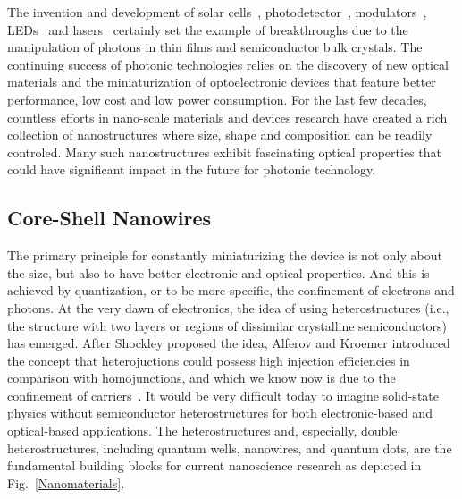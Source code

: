 The invention and development of solar
cells~\cite{sun2005organic,perlin1999space},
photodetector~\cite{razeghi1996semiconductor,rogalski2002infrared},
modulators~\cite{chen2011broadband,schuller2010plasmonics},
LEDs~\cite{spanggaard2004brief,schubert2005solid,schubert2005light} and
lasers~\cite{chow2012semiconductor,yablonovitch1987inhibited} certainly set the
example of breakthroughs due to the manipulation of photons in thin films and
semiconductor bulk crystals. The continuing success of photonic technologies
relies on the discovery of new optical materials and the miniaturization of
optoelectronic devices that feature better performance, low cost and low power
consumption. For the last few decades, countless efforts in nano-scale
materials and devices research have created a rich collection of nanostructures
where size, shape and composition can be readily controled. Many such
nanostructures exhibit fascinating optical properties that could have
significant impact in the future for photonic technology.

\subsection{Core-Shell Nanowires} \label{sec:intro_CSNW}

The primary principle for constantly miniaturizing the device is not only about
the size, but also to have better electronic and optical properties. And
this is achieved by quantization, or to be more specific, the confinement of
electrons and photons. At the very dawn of electronics, the idea of using
heterostructures (i.e., the structure with two layers or regions of dissimilar
crystalline semiconductors) has emerged. After Shockley proposed the idea,
Alferov and Kroemer introduced the concept that heterojuctions could possess
high injection efficiencies in comparison with homojunctions, and which we know now
is due to the confinement of carriers~\cite{alferov2000double}. It would be
very difficult today to imagine solid-state physics without semiconductor
heterostructures for both electronic-based and optical-based applications. The
heterostructures and, especially, double heterostructures, including quantum
wells, nanowires, and quantum dots, are the fundamental building blocks for
current nanoscience research as depicted in Fig.~\ref{Nanomaterials}.

